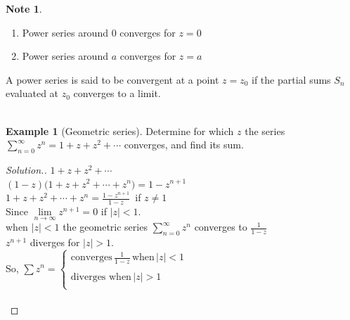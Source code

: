 \documentclass[11pt,a4paper]{article}
\theoremstyle{definition}
\newtheorem{example}[thm]{Example}
\newtheorem{note}[thm]{Note}
\newenvironment{solution}
  {\renewcommand{\qedsymbol}{}\begin{proof}[\textit{Solution}.]}
  {\end{proof}}
\begin{document}
\begin{note}
\begin{enumerate}
\item[$\implies$] Power series around $0$ converges for $z = 0$
\item[$\implies$] Power series around $a$ converges for $z = a$\\
\end{enumerate}
\end{note}



A power series is said to be convergent at a point $z  = z_0$ if the partial sums $S_n$ evaluated at $z_0$ converges to a limit.\\\\





\begin{example}[Geometric series]
Determine for which $z$ the series $\displaystyle{\sum^{\infty}_{n=0}z^n=1+z+z^2+\cdots}$ converges, and find its sum.
\end{example}

\begin{solution}
$\displaystyle{1 + z + z^2 + \cdots}$\\

$\displaystyle{(1 - z)\big(1 + z + z^2 + \cdots + z^n\big) = 1 - z^{n+1}}$\\

$\displaystyle{1 + z + z^2 + \cdots + z^n = \frac{1 - z^{n + 1}}{1 - z}}\,$ if $z\neq 1$\\

Since $\lim\limits_{n\rightarrow \infty} z^{n + 1} = 0$ if $ \left|z\right| < 1$.\\

when $\left|z\right| < 1$ the geometric series $\displaystyle{\sum^{\infty}_{n = 0}z^n}$ converges to $\frac{1}{1 - z}$\\

$z^{n + 1}$ diverges for $\left|z\right|> 1$.\\

So, $\displaystyle{\sum z^n = \begin{cases}
\text{converges}\, \frac{1}{1 - z}\,\text{when}\, \left|z\right| < 1\\\\
\text{diverges when}\,\left|z\right|> 1\\
\end{cases}
}$\\\\


\end{solution}
\end{document}
